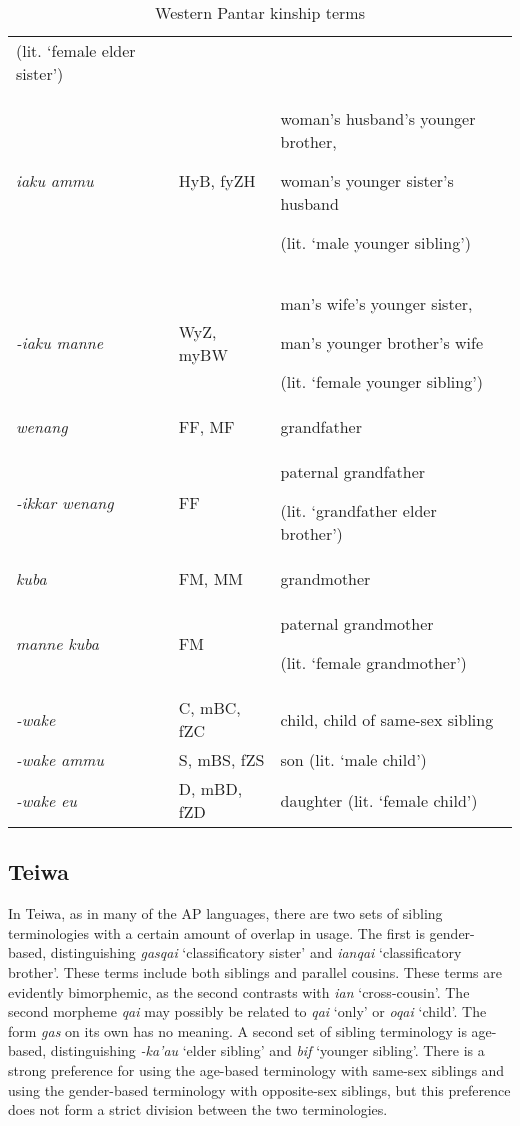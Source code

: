 \begin{table}
\begin{tabular}{p{3cm}p{3cm}p{5cm}}
(lit. `female elder sister')\\
\textit{iaku ammu} & HyB, fyZH & woman's husband's younger brother,

woman's younger sister's husband

(lit. `male younger sibling')\\
\textit{{}-iaku manne} & WyZ, myBW & man's wife's younger sister,

man's younger brother's wife

(lit. `female younger sibling')\\
\textit{wenang} & FF, MF & grandfather\\
\textit{{}-ikkar wenang} & FF & paternal grandfather

(lit. `grandfather elder brother')\\
\textit{kuba} & FM, MM & grandmother\\
\textit{manne kuba} & FM & paternal grandmother

(lit. `female grandmother')\\
\textit{{}-wake} & C, mBC, fZC & child, child of same-sex sibling\\
\textit{{}-wake ammu} & S, mBS, fZS & son (lit. `male child')\\
\textit{{}-wake eu} & D, mBD, fZD & daughter (lit. `female child')\\
\end{tabular}

\caption{Western Pantar kinship terms}
\end{table}

\subsection{Teiwa}
\label{bkm:Ref247777020}In Teiwa, as in many of the AP languages, there are two sets of sibling terminologies with a certain amount of overlap in usage. The first is gender-based, distinguishing \textit{gasqai} `classificatory sister' and \textit{ianqai} `classificatory brother'. These terms include both siblings and parallel cousins. These terms are evidently bimorphemic, as the second contrasts with \textit{ian} `cross-cousin'. The second morpheme \textit{qai} may possibly be related to \textit{qai} `only' or \textit{oqai} `child'. The form \textit{gas} on its own has no meaning. A second set of sibling terminology is age-based, distinguishing \textit{{}-ka'au} `elder sibling' and \textit{bif}  `younger sibling'. There is a strong preference for using the age-based terminology with same-sex siblings and using the gender-based terminology with opposite-sex siblings, but this preference does not form a strict division between the two terminologies.

